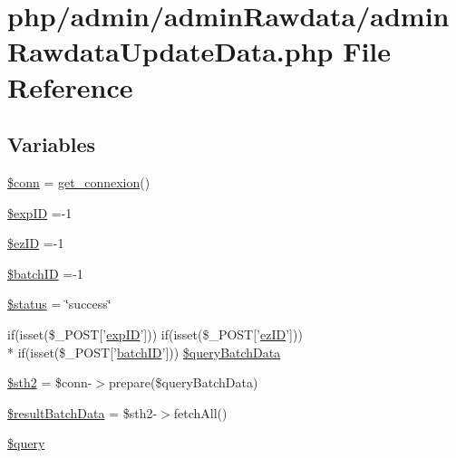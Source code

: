 \hypertarget{admin_rawdata_update_data_8php}{\section{php/admin/admin\-Rawdata/admin\-Rawdata\-Update\-Data.php File Reference}
\label{admin_rawdata_update_data_8php}
}
\subsection*{Variables}
\begin{DoxyCompactItemize}
\item 
\hyperlink{admin_rawdata_update_data_8php_aa8a5a87b9c1a6a0819b88447cbe41877}{\$conn} = \hyperlink{php__functions_8php_ace18bc10f3fd08f92688ac743e0d8c2e}{get\-\_\-connexion}()
\item 
\hyperlink{admin_rawdata_update_data_8php_ae384d32e62e85e587cd27bf249ed3db3}{\$exp\-I\-D} =-\/1
\item 
\hyperlink{admin_rawdata_update_data_8php_addb1ec3ba55e413a08cb006ce21974df}{\$ez\-I\-D} =-\/1
\item 
\hyperlink{admin_rawdata_update_data_8php_aaa6d122ea9cb55b210aadd86e5654a74}{\$batch\-I\-D} =-\/1
\item 
\hyperlink{admin_rawdata_update_data_8php_a58391ea75f2d29d5d708d7050b641c33}{\$status} = \char`\"{}success\char`\"{}
\item 
if(isset(\$\-\_\-\-P\-O\-S\-T\mbox{[}'\hyperlink{admin_rawdata_8php_a888d53a6517f4272b5982c3ca9d16e8a}{exp\-I\-D}'\mbox{]})) if(isset(\$\-\_\-\-P\-O\-S\-T\mbox{[}'\hyperlink{admin_rawdata_8php_adf465cadf95987152966d26567509f92}{ez\-I\-D}'\mbox{]})) \\*
if(isset(\$\-\_\-\-P\-O\-S\-T\mbox{[}'\hyperlink{obsolete_2processing__bak_8php_a88c5bc4262b7c34f236357f5c53fc99b}{batch\-I\-D}'\mbox{]})) \hyperlink{admin_rawdata_update_data_8php_a5999a93025922833d2c38a633e49c828}{\$query\-Batch\-Data}
\item 
\hyperlink{admin_rawdata_update_data_8php_a2f84d43fa0033773278ae89295389bc6}{\$sth2} = \$conn-\/$>$prepare(\$query\-Batch\-Data)
\item 
\hyperlink{admin_rawdata_update_data_8php_ae0a126caf328023cf68f759c1cfcc38f}{\$result\-Batch\-Data} = \$sth2-\/$>$fetch\-All()
\item 
\hyperlink{admin_rawdata_update_data_8php_af59a5f7cd609e592c41dc3643efd3c98}{\$query}
\item 

\end{DoxyCompactItemize}
